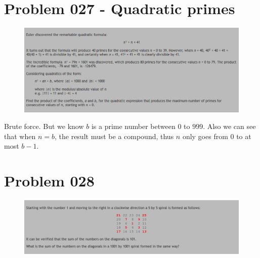 \section{Problem 027 - Quadratic primes}
\begin{prob}
	\begin{figure}[htb!]
		\begin{center}
			\includegraphics[scale = 0.4]{pic/027.png}
		\end{center}
	\end{figure}
\end{prob}
\begin{sol}
Brute force. But we know $b$ is a prime number between $0$ to $999$. Also we can see that when $n = b$, the result must be a compound, thus $n$ only goes from $0$ to at most $b - 1$.
\end{sol}

\section{Problem 028}
\begin{prob}
	\begin{figure}[htb!]
		\begin{center}
			\includegraphics[scale = 0.4]{pic/028.png}
		\end{center}
	\end{figure}
\end{prob}

\begin{sol}

\end{sol}

